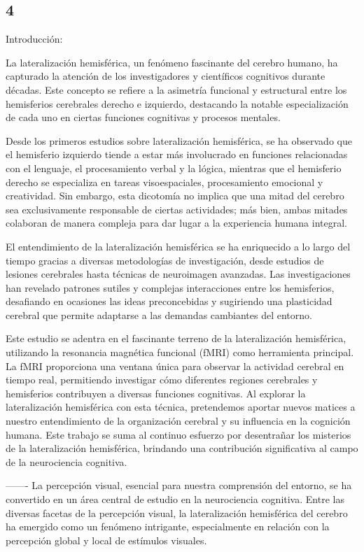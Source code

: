 \documentclass[12pt,oneside]{uhthesis}
\begin{document}
\subsection{4}

Introducción:

La lateralización hemisférica, un fenómeno fascinante del cerebro humano, ha capturado la atención de los investigadores y científicos cognitivos durante décadas. Este concepto se refiere a la asimetría funcional y estructural entre los hemisferios cerebrales derecho e izquierdo, destacando la notable especialización de cada uno en ciertas funciones cognitivas y procesos mentales.

Desde los primeros estudios sobre lateralización hemisférica, se ha observado que el hemisferio izquierdo tiende a estar más involucrado en funciones relacionadas con el lenguaje, el procesamiento verbal y la lógica, mientras que el hemisferio derecho se especializa en tareas visoespaciales, procesamiento emocional y creatividad. Sin embargo, esta dicotomía no implica que una mitad del cerebro sea exclusivamente responsable de ciertas actividades; más bien, ambas mitades colaboran de manera compleja para dar lugar a la experiencia humana integral.

El entendimiento de la lateralización hemisférica se ha enriquecido a lo largo del tiempo gracias a diversas metodologías de investigación, desde estudios de lesiones cerebrales hasta técnicas de neuroimagen avanzadas. Las investigaciones han revelado patrones sutiles y complejas interacciones entre los hemisferios, desafiando en ocasiones las ideas preconcebidas y sugiriendo una plasticidad cerebral que permite adaptarse a las demandas cambiantes del entorno.

Este estudio se adentra en el fascinante terreno de la lateralización hemisférica, utilizando la resonancia magnética funcional (fMRI) como herramienta principal. La fMRI proporciona una ventana única para observar la actividad cerebral en tiempo real, permitiendo investigar cómo diferentes regiones cerebrales y hemisferios contribuyen a diversas funciones cognitivas. Al explorar la lateralización hemisférica con esta técnica, pretendemos aportar nuevos matices a nuestro entendimiento de la organización cerebral y su influencia en la cognición humana. Este trabajo se suma al continuo esfuerzo por desentrañar los misterios de la lateralización hemisférica, brindando una contribución significativa al campo de la neurociencia cognitiva.

-------
La percepción visual, esencial para nuestra comprensión del entorno, se ha convertido en un área central de estudio en la neurociencia cognitiva. Entre las diversas facetas de la percepción visual, la lateralización hemisférica del cerebro ha emergido como un fenómeno intrigante, especialmente en relación con la percepción global y local de estímulos visuales.
\end{document}
